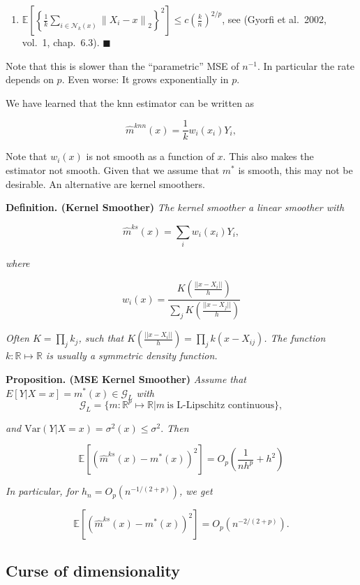 \documentclass[
]{book}
\providecommand{\tightlist}{%
  \setlength{\itemsep}{0pt}\setlength{\parskip}{0pt}}
\begin{document}
\begin{enumerate}
\def\labelenumi{(\arabic{enumi})}
\tightlist
\item
  \(\mathbb E\left[ \left \{\frac{1}{k} \sum_{i \in \mathcal{N}_k(x)}\left\|X_i-x\right\|_2 \right\}^2 \right]\leq c \left(\frac k n \right)^{2/p}\), see (Gyorfi et al.~2002, vol.~1, chap.~6.3). \(\blacksquare\)
\end{enumerate}

Note that this is slower than the ``parametric'' MSE of \(n^{-1}\). In particular the rate depends on \(p\). Even worse: It grows exponentially in \(p\).

We have learned that the knn estimator can be written as

\[
\hat m^{knn}(x)= \frac 1 k w_i(x_i) Y_i,
\]

Note that \(w_i(x)\) is not smooth as a function of \(x\). This also makes the estimator not smooth. Given that we assume that \(m^\ast\) is smooth, this may not be desirable. An alternative are kernel smoothers.

\textbf{Definition. (Kernel Smoother)} \emph{The kernel smoother a linear smoother with }

\[
\hat m^{ks}(x)=  \sum_i w_i(x_i) Y_i,
\]

\emph{where }

\[
w_i(x)=\frac{K\left(\frac{||x-X_i||}{h}\right)}{\sum_j K\left(\frac{||x-X_j||}{h}\right)}
\]

\emph{Often \(K=\prod_j k_j\), such that \(K\left(\frac{||x-X_i||}{h}\right)=\prod_j k(x-X_{ij})\). The function \(k: \mathbb R \mapsto \mathbb R\) is usually a symmetric density function.}

\textbf{Proposition. (MSE Kernel Smoother)} \emph{Assume that \(E[Y|X=x]=m^\ast(x)\in \mathcal G_L\) with}
\[
\mathcal G_L = \{m: \mathbb R^p \mapsto \mathbb R| m \ \text{is L-Lipschitz continuous}\},
\]

\emph{and \(\textrm{Var}(Y|X=x)=\sigma^2(x)\leq \sigma^2.\) Then }

\[
\mathbb E[(\hat m^{ks}(x)-m^\ast(x))^2]= O_p\left( \frac{1}{nh^p} + h^2 \right)
\]

\emph{In particular, for \(h_n=O_p(n^{-1/(2+p)})\), we get }

\[
\mathbb E[(\hat m^{ks}(x)-m^\ast(x))^2]=O_p(n^{-2/(2+p)}).
\]

\hypertarget{curse-of-dimensionality}{%
\subsection{Curse of dimensionality}\label{curse-of-dimensionality}}
\end{document}

